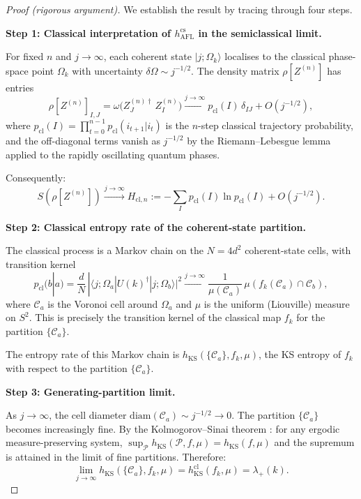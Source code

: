 \documentclass[12pt,a4paper]{article}
\begin{document}
\begin{proof}[Proof (rigorous argument)]
We establish the result by tracing through four steps.

\medskip
\noindent\textbf{Step 1: Classical interpretation of $h_{\mathrm{AFL}}^{\mathrm{cs}}$
in the semiclassical limit.}

For fixed $n$ and $j\to\infty$, each coherent state $|j;\Omega_k\rangle$
localises to the classical phase-space point $\Omega_k$ with uncertainty
$\delta\Omega \sim j^{-1/2}$.  The density matrix $\rho[Z^{(n)}]$ has
entries
\[
  \rho[Z^{(n)}]_{I,J}
  = \omega\!\bigl(Z^{(n)\dagger}_{J}\,Z^{(n)}_{I}\bigr)
  \xrightarrow{j\to\infty}
  p_{\mathrm{cl}}(I)\,\delta_{IJ}
  + O(j^{-1/2}),
\]
where $p_{\mathrm{cl}}(I) = \prod_{t=0}^{n-1}p_{\mathrm{cl}}(i_{t+1}|i_t)$
is the $n$-step classical trajectory probability, and the off-diagonal
terms vanish as $j^{-1/2}$ by the Riemann--Lebesgue lemma applied to
the rapidly oscillating quantum phases.

Consequently:
\[
  S(\rho[Z^{(n)}]) \xrightarrow{j\to\infty} H_{\mathrm{cl},n}
  := -\sum_I p_{\mathrm{cl}}(I)\ln p_{\mathrm{cl}}(I) + O(j^{-1/2}).
\]

\noindent\textbf{Step 2: Classical entropy rate of the coherent-state partition.}

The classical process is a Markov chain on the $N=4d^2$ coherent-state
cells, with transition kernel
\[
  p_{\mathrm{cl}}(b|a)
  = \frac{d}{N}\,|\langle j;\Omega_a|U(k)^\dagger|j;\Omega_b\rangle|^2
  \xrightarrow{j\to\infty}
  \frac{1}{\mu(\mathcal{C}_a)}\,\mu(f_k(\mathcal{C}_a)\cap\mathcal{C}_b),
\]
where $\mathcal{C}_a$ is the Voronoi cell around $\Omega_a$ and $\mu$
is the uniform (Liouville) measure on $S^2$.  This is precisely the
transition kernel of the classical map $f_k$ for the partition
$\{\mathcal{C}_a\}$.

The entropy rate of this Markov chain is $h_{\mathrm{KS}}(\{\mathcal{C}_a\}, f_k, \mu)$,
the KS entropy of $f_k$ with respect to the partition $\{\mathcal{C}_a\}$.

\noindent\textbf{Step 3: Generating-partition limit.}

As $j\to\infty$, the cell diameter $\mathrm{diam}(\mathcal{C}_a) \sim j^{-1/2}
\to 0$.  The partition $\{\mathcal{C}_a\}$ becomes increasingly fine.  By
the Kolmogorov--Sinai theorem \cite{rohlin1967}: for any ergodic
measure-preserving system, $\sup_\mathcal{P} h_{\mathrm{KS}}(\mathcal{P}, f, \mu)
= h_{\mathrm{KS}}(f,\mu)$ and the supremum is attained in the limit of
fine partitions.  Therefore:
\[
  \lim_{j\to\infty}h_{\mathrm{KS}}(\{\mathcal{C}_a\},f_k,\mu)
  = h_{\mathrm{KS}}^{\mathrm{cl}}(f_k, \mu)
  = \lambda_+(k).
\]


\end{proof}
\end{document}
